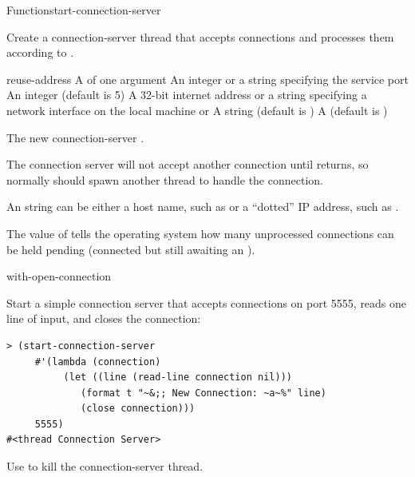 \documentclass[10pt,twoside,english,pdftex]{article}
\begin{document}
\begin{functiondoc}{Function}{start-connection-server}%
  {  
   \returns{} }
%
%
%
%

\fnsyntax

\fnpurpose Create a connection-server thread that accepts connections
and processes them according to .

\fnpackage {}

\fnmodule {}

\fnargs
\begin{args}{reuse-address}
\arg[function] A  of one argument
\arg[port] An integer or a string specifying the service port
\arg[backlog] An integer (default is 5)
\arg[interface] A 32-bit internet address or a string specifying a network 
interface on the local machine or \nil 
\arg[name] A string (default is )
 A  (default is \nil)
\end{args}

\fnreturns The new connection-server .

\fnerrors
\nothreads{}

%
\fndescription The connection server will not accept another
connection until  returns, so normally
 should spawn another thread to handle the
connection.  

An  string can be either a host name, such as
 or a ``dotted'' IP address, such as .

The value of  tells the operating system
how many unprocessed connections can be held pending (connected but
still awaiting an \textbf{}).

\begin{alsos}{with-open-connection}
\end{alsos}

\fnexample
Start a simple connection server that accepts connections on port
5555, reads one line of input, and closes the connection:
\begin{verbatim}
> (start-connection-server
     #'(lambda (connection)
          (let ((line (read-line connection nil)))
             (format t "~&;; New Connection: ~a~%" line)
             (close connection)))
     5555)
#<thread Connection Server>
\end{verbatim}

%
\fnnotes
Use \textbf{} to kill the connection-server thread.

\end{functiondoc}
\end{document}
